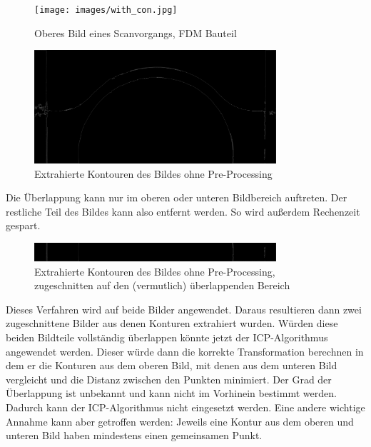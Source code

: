\documentclass[../main.tex]{subfiles}
\begin{document}
\begin{figure}[h]
    \centering
    \texttt{[image: images/with\_con.jpg]} %
    \caption{Oberes Bild eines Scanvorgangs, FDM Bauteil}
    \label{fig:image_top}
\end{figure}

\begin{figure}[h]
    \centering
    \includegraphics[width=0.8\textwidth]{images/only_con.jpg} %
    \caption{Extrahierte Kontouren des Bildes ohne Pre-Processing}
    \label{fig:cons}
\end{figure}

Die Überlappung kann nur im oberen oder unteren Bildbereich auftreten. Der restliche 
Teil des Bildes kann also entfernt werden. So wird außerdem Rechenzeit gespart.

\begin{figure}[h]
    \centering
    \includegraphics[width=0.8\textwidth]{images/only_con_cut.jpg} %
    \caption{Extrahierte Kontouren des Bildes ohne Pre-Processing, zugeschnitten 
    auf den (vermutlich) überlappenden Bereich}
    \label{fig:cons_cut}
\end{figure}

Dieses Verfahren wird auf beide Bilder angewendet. Daraus resultieren dann zwei 
zugeschnittene Bilder aus denen Konturen extrahiert wurden. 
Würden diese beiden Bildteile vollständig überlappen könnte jetzt der ICP-Algorithmus
angewendet werden. Dieser würde dann die korrekte Transformation berechnen in dem er 
die Konturen aus dem oberen Bild, mit denen aus dem unteren Bild vergleicht und die 
Distanz zwischen den Punkten minimiert. 
Der Grad der Überlappung ist unbekannt und kann nicht im Vorhinein bestimmt werden.
Dadurch kann der ICP-Algorithmus nicht eingesetzt werden. 
Eine andere wichtige Annahme kann aber getroffen werden: Jeweils eine Kontur aus 
dem oberen und unteren Bild haben mindestens einen gemeinsamen Punkt.
\end{document}
